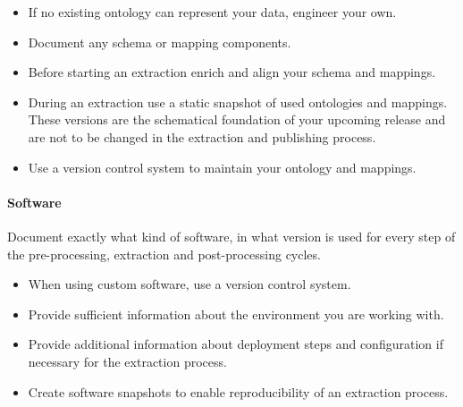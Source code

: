 \documentclass[a4paper,english,twoside,BCOR1.5cm,headsepline,DIV12,appendixprefix,final,12pt]{scrbook}
\begin{document}
\begin{itemize}
\itemsep0em 
\item If no existing ontology can represent your data, engineer your own. %
\item Document any schema or mapping components. 
\item Before starting an extraction enrich and align your schema and mappings.
\item During an extraction use a static snapshot of used ontologies and mappings. These versions are the schematical foundation of your upcoming release and are not to be changed in the extraction and publishing process.

\item Use a version control system to maintain your ontology and mappings.%
\end{itemize}


\vspace{-1.5em}
\paragraph{Software}
Document exactly what kind of software, in what version is used for every step of the pre-processing, extraction and post-processing cycles.

\begin{itemize}
\itemsep0em 
\item When using custom software, use a version control system.
\item Provide sufficient information about the environment you are working with.
\item Provide additional information about deployment steps and configuration if necessary for the extraction process.
\item Create software snapshots to enable reproducibility of an extraction process.
\end{itemize}
\end{document}
